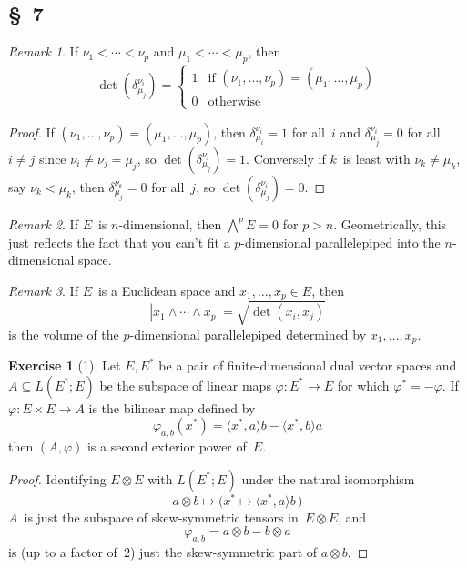 \documentclass[letterpaper,12pt]{article}
\newcommand{\tprod}{\otimes}
\newcommand{\eprod}{\wedge}
\newcommand{\bigeprod}{\bigwedge}
\newcommand{\medeprod}{{\textstyle\bigeprod}}
\newcommand{\sprod}[2]{\langle#1,#2\rangle}
\newcommand{\iprod}[2]{(#1,#2)}
\newcommand{\norm}[1]{|#1|}
\newcommand{\multi}[4]{#2_{#3}#1\cdots#1#2_{#4}}
\newcommand{\eprods}[3]{\multi{\eprod}{#1}{#2}{#3}}
\theoremstyle{definition}
\newtheorem*{exer}{Exercise}
\theoremstyle{remark}
\newtheorem*{rmk}{Remark}
\begin{document}
\subsection*{\S~7}
\begin{rmk}
If \(\nu_1<\cdots<\nu_p\) and \(\mu_1<\cdots<\mu_p\), then
\[\det(\delta^{\nu_i}_{\mu_j})=\begin{cases}
1&\text{if }(\nu_1,\ldots,\nu_p)=(\mu_1,\ldots,\mu_p)\\
0&\text{otherwise}
\end{cases}\]
\end{rmk}
\begin{proof}
If \((\nu_1,\ldots,\nu_p)=(\mu_1,\ldots,\mu_p)\), then \(\delta^{\nu_i}_{\mu_i}=1\) for all~\(i\) and \(\delta^{\nu_i}_{\mu_j}=0\) for all \(i\ne j\) since \(\nu_i\ne\nu_j=\mu_j\), so \(\det(\delta^{\nu_i}_{\mu_j})=1\). Conversely if \(k\)~is least with \(\nu_k\ne\mu_k\), say \(\nu_k<\mu_k\), then \(\delta^{\nu_k}_{\mu_j}=0\) for all~\(j\), so \(\det(\delta^{\nu_i}_{\mu_j})=0\).
\end{proof}

\begin{rmk}
If \(E\)~is \(n\)-dimensional, then \(\medeprod^p E=0\) for \(p>n\). Geometrically, this just reflects the fact that you can't fit a \(p\)-dimensional parallelepiped into the \(n\)-dimensional space.
\end{rmk}

\begin{rmk}
If \(E\)~is a Euclidean space and \(x_1,\ldots,x_p\in E\), then
\[\norm{\eprods{x}{1}{p}}=\sqrt{\det\iprod{x_i}{x_j}}\]
is the volume of the \(p\)-dimensional parallelepiped determined by \(x_1,\ldots,x_p\).
\end{rmk}

\begin{exer}[1]
Let \(E,E^*\) be a pair of finite-dimensional dual vector spaces and \(A\subseteq L(E^*;E)\) be the subspace of linear maps \(\varphi:E^*\to E\) for which \(\varphi^*=-\varphi\). If \(\varphi:E\times E\to A\) is the bilinear map defined by
\[\varphi_{a,b}(x^*)=\sprod{x^*}{a}b-\sprod{x^*}{b}a\]
then \((A,\varphi)\) is a second exterior power of~\(E\).
\end{exer}
\begin{proof}
Identifying \(E\tprod E\) with \(L(E^*;E)\) under the natural isomorphism
\[a\tprod b\mapsto\bigl(x^*\mapsto\sprod{x^*}{a}b\,\bigr)\]
\(A\)~is just the subspace of skew-symmetric tensors in~\(E\tprod E\), and
\[\varphi_{a,b}=a\tprod b-b\tprod a\]
is (up to a factor of~\(2\)) just the skew-symmetric part of \(a\tprod b\).
\end{proof}
\end{document}
